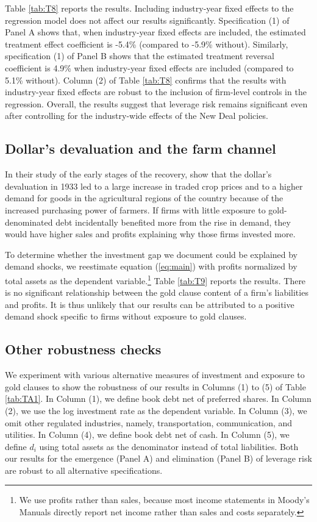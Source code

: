 Table \ref{tab:T8} reports the results. Including industry-year fixed effects to the regression model does not affect our results significantly. Specification (1) of Panel A shows that, when industry-year fixed effects are included, the estimated treatment effect coefficient is -5.4\% (compared to -5.9\% without). Similarly, specification (1) of Panel B shows that the estimated treatment reversal coefficient is 4.9\% when industry-year fixed effects are included (compared to 5.1\% without). Column (2) of Table \ref{tab:T8} confirms that the results with industry-year fixed effects are robust to the inclusion of firm-level controls in the regression. Overall, the results suggest that leverage risk remains significant even after controlling for the industry-wide effects of the New Deal policies.

\subsection{Dollar's devaluation and the farm channel}

In their study of the early stages of the recovery, \cite{Hausman2017} show that the dollar's devaluation in 1933 led to a large increase in traded crop prices and to a higher demand for goods in the agricultural regions of the country because of the increased purchasing power of farmers. If firms with little exposure to gold-denominated debt incidentally benefited more from the rise in demand, they would have higher sales and profits explaining why those firms invested more.

To determine whether the investment gap we document could be explained by demand shocks, we reestimate equation (\ref{eq:main}) with profits normalized by total assets as the dependent variable.\footnote{We use profits rather than sales, because most income statements in Moody's Manuals directly report net income rather than sales and costs separately.} Table \ref{tab:T9} reports the results. There is no significant relationship between the gold clause content of a firm's liabilities and profits. It is thus unlikely that our results can be attributed to a positive demand shock specific to firms without exposure to gold clauses. 

\subsection{Other robustness checks}

We experiment with various alternative measures of investment and exposure to gold clauses to show the robustness of our results in Columns (1) to (5) of Table \ref{tab:TA1}. In Column (1), we define book debt net of preferred shares. In Column (2), we use the log investment rate as the dependent variable. In Column (3), we omit other regulated industries, namely, transportation, communication, and utilities. In Column (4), we define book debt net of cash. In Column (5), we define $d_i$ using total assets as the denominator instead of total liabilities. Both our results for the emergence (Panel A) and elimination (Panel B) of leverage risk are robust to all alternative specifications.

